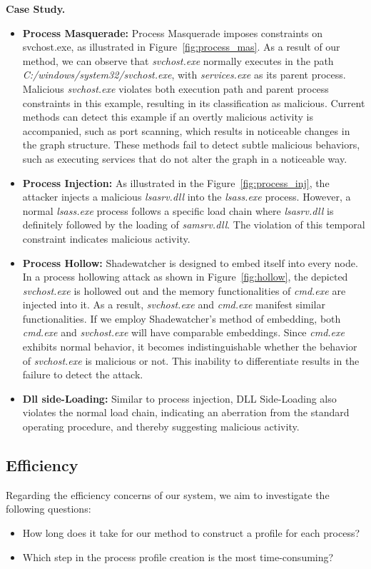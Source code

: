\textbf{Case Study.}
\begin{itemize}
    \item \textbf{Process Masquerade:} Process Masquerade imposes constraints on svchost.exe, as illustrated in Figure~\ref{fig:process_mas}. As a result of our method, we can observe that \textit{svchost.exe} normally executes in the path \textit{C:/windows/system32/svchost.exe}, with \textit{services.exe} as its parent process. Malicious \textit{svchost.exe} violates both execution path and parent process constraints in this example, resulting in its classification as malicious. Current methods \cite{wang2022threatrace} can detect this example if an overtly malicious activity is accompanied, such as port scanning, which results in noticeable changes in the graph structure. These methods fail to detect subtle malicious behaviors, such as executing services that do not alter the graph in a noticeable way.
    \item \textbf{Process Injection:} As illustrated in the Figure~\ref{fig:process_inj}, the attacker injects a malicious \textit{lsasrv.dll} into the \textit{lsass.exe} process. However, a normal \textit{lsass.exe} process follows a specific load chain where \textit{lsasrv.dll} is definitely followed by the loading of \textit{samsrv.dll}. The violation of this temporal constraint indicates malicious activity.
    \item \textbf{Process Hollow:} Shadewatcher is designed to embed itself into every node. In a process hollowing attack as shown in Figure~\ref{fig:hollow}, the depicted \textit{svchost.exe} is hollowed out and the memory functionalities of \textit{cmd.exe} are injected into it. As a result, \textit{svchost.exe} and \textit{cmd.exe} manifest similar functionalities. If we employ Shadewatcher's method of embedding, both \textit{cmd.exe} and \textit{svchost.exe} will have comparable embeddings. Since \textit{cmd.exe} exhibits normal behavior, it becomes indistinguishable whether the behavior of \textit{svchost.exe} is malicious or not. This inability to differentiate results in the failure to detect the attack.
    \item \textbf{Dll side-Loading:} Similar to process injection, DLL Side-Loading also violates the normal load chain, indicating an aberration from the standard operating procedure, and thereby suggesting malicious activity.
\end{itemize}



\subsection{Efficiency}
\label{sec-eff}
Regarding the efficiency concerns of our system, we aim to investigate the following questions:
\begin{itemize}
    \item How long does it take for our method to construct a profile for each process?
    \item Which step in the process profile creation is the most time-consuming?
\end{itemize}

